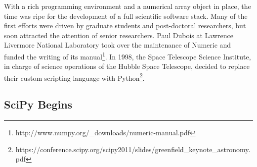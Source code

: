 \documentclass[fleqn,10pt]{wlscirep}
\begin{document}
With a rich programming environment and a numerical array object in
place, the time was ripe for the development of a full scientific
software stack.  Many of the first efforts were driven by graduate
students and post-doctoral researchers, but soon attracted the
attention of senior researchers.
Paul Dubois at Lawrence Livermore National Laboratory took over the
maintenance of Numeric and funded the writing of its
manual\footnote{http://www.numpy.org/\_downloads/numeric-manual.pdf}.
In 1998, the Space Telescope Science Institute, in charge of science
operations of the Hubble Space Telescope, decided to replace their
custom scripting language with Python\footnote{https://conference.scipy.org/scipy2011/slides/greenfield\_keynote\_astronomy.pdf}.

%


\subsection*{SciPy Begins}
\end{document}
